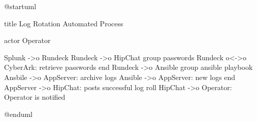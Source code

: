 @startuml

title Log Rotation Automated Process

actor Operator

Splunk ->o Rundeck
Rundeck ->o HipChat
group passwords
  Rundeck o<->o CyberArk: retrieve passwords
end
Rundeck ->o Ansible
group ansible playbook
  Ansbile ->o AppServer: archive logs
  Ansible ->o AppServer: new logs
end
AppServer ->o HipChat: posts successful log roll
HipChat ->o Operator: Operator is notified

@enduml
